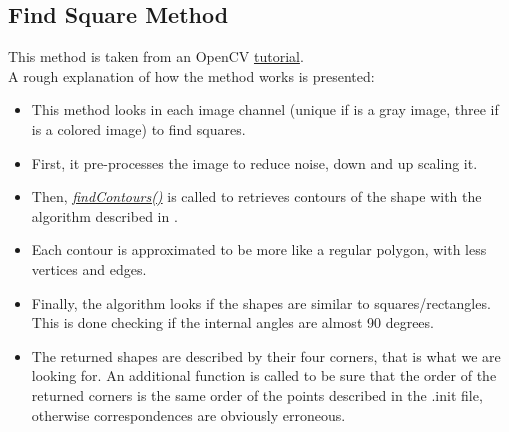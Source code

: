 \subsection{Find Square Method}
\label{subsec:findSquare}
This method is taken from an OpenCV \href{https://docs.opencv.org/3.4/db/d00/samples_2cpp_2squares_8cpp-example.html}{tutorial}.\\
A rough explanation of how the method works is presented:
\begin{itemize}
	\item This method looks in each image channel (unique if is a gray image, three if is a colored image) to find squares.
	\item First, it pre-processes the image to reduce noise, down and up scaling it.
	\item Then, \href{https://docs.opencv.org/3.4.6/d3/dc0/group__imgproc__shape.html#ga17ed9f5d79ae97bd4c7cf18403e1689a}{\textit{findContours()}} is called to retrieves contours of the shape with the algorithm described in \cite{findcountors}.
	\item Each contour is approximated to be more like a regular polygon, with less vertices and edges.
	\item Finally, the algorithm looks if the shapes are similar to squares/rectangles. This is done checking if the internal angles are almost 90 degrees.
	\item The returned shapes are described by their four corners, that is what we are looking for. An additional function is called to be sure that the order of the returned corners is the same order of the points described in the .init file, otherwise correspondences are obviously erroneous.	
\end{itemize}



